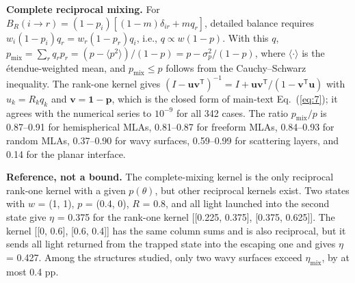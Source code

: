 \documentclass[10pt]{article}
\begin{document}
\begin{table}[htbp]
\centering
\footnotesize
\caption*{\textbf{Table S1.} Error of the reciprocal reduced model against the angular cutoff of the spectral quantities (pp; class columns give the mean error over three devices and three wavelengths).}
\end{table}

\textbf{Complete reciprocal mixing.} For $B_R(i\to r) = (1-p_i)[(1-m)\delta_{ir} + m q_r]$, detailed balance requires $w_i(1-p_i)q_r = w_r(1-p_r)q_i$, i.e., $q \propto w(1-p)$. With this $q$, $p_{\mathrm{mix}} = \sum_r q_r p_r = (p - \langle p^2\rangle)/(1-p) = p - \sigma_p^2/(1-p)$, where $\langle\cdot\rangle$ is the étendue-weighted mean, and $p_{\mathrm{mix}} \le p$ follows from the Cauchy–Schwarz inequality. The rank-one kernel gives $(I-\mathbf{u}\mathbf{v}^{\mathsf T})^{-1} = I + \mathbf{u}\mathbf{v}^{\mathsf T}/(1-\mathbf{v}^{\mathsf T}\mathbf{u})$ with $u_k = R_k q_k$ and $\mathbf{v} = \mathbf{1}-\mathbf{p}$, which is the closed form of main-text Eq.~(\ref{eq:7}); it agrees with the numerical series to $10^{-9}$ for all 342 cases. The ratio $p_{\mathrm{mix}}/p$ is 0.87–0.91 for hemispherical MLAs, 0.81–0.87 for freeform MLAs, 0.84–0.93 for random MLAs, 0.37–0.90 for wavy surfaces, 0.59–0.99 for scattering layers, and 0.14 for the planar interface.

\textbf{Reference, not a bound.} The complete-mixing kernel is the only reciprocal rank-one kernel with a given $p(\theta)$, but other reciprocal kernels exist. Two states with $w$ = (1, 1), $p$ = (0.4, 0), $R$ = 0.8, and all light launched into the second state give $\eta$ = 0.375 for the rank-one kernel [[0.225, 0.375], [0.375, 0.625]]. The kernel [[0, 0.6], [0.6, 0.4]] has the same column sums and is also reciprocal, but it sends all light returned from the trapped state into the escaping one and gives $\eta$ = 0.427. Among the structures studied, only two wavy surfaces exceed $\eta_{\mathrm{mix}}$, by at most 0.4 pp.
\end{document}
